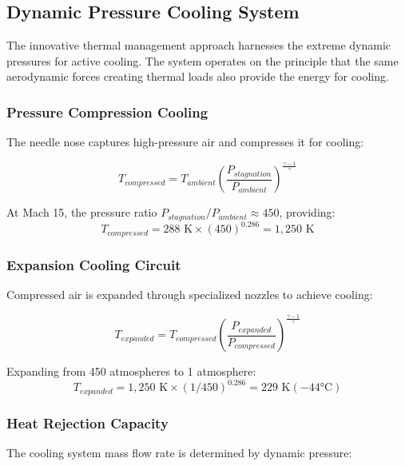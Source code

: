 \documentclass[12pt,a4paper]{article}
\begin{document}
\subsection{Dynamic Pressure Cooling System}

The innovative thermal management approach harnesses the extreme dynamic pressures for active cooling. The system operates on the principle that the same aerodynamic forces creating thermal loads also provide the energy for cooling.

\subsubsection{Pressure Compression Cooling}
The needle nose captures high-pressure air and compresses it for cooling:

\begin{equation}
T_{compressed} = T_{ambient} \left(\frac{P_{stagnation}}{P_{ambient}}\right)^{\frac{\gamma-1}{\gamma}}
\label{eq:compression_temperature}
\end{equation}

At Mach 15, the pressure ratio $P_{stagnation}/P_{ambient} \approx 450$, providing:
\begin{equation}
T_{compressed} = 288 \text{ K} \times (450)^{0.286} = 1,250 \text{ K}
\label{eq:compressed_temp_calc}
\end{equation}

\subsubsection{Expansion Cooling Circuit}
Compressed air is expanded through specialized nozzles to achieve cooling:

\begin{equation}
T_{expanded} = T_{compressed} \left(\frac{P_{expanded}}{P_{compressed}}\right)^{\frac{\gamma-1}{\gamma}}
\label{eq:expansion_temperature}
\end{equation}

Expanding from 450 atmospheres to 1 atmosphere:
\begin{equation}
T_{expanded} = 1,250 \text{ K} \times (1/450)^{0.286} = 229 \text{ K} (-44°\text{C})
\label{eq:expanded_temp_calc}
\end{equation}

\subsubsection{Heat Rejection Capacity}
The cooling system mass flow rate is determined by dynamic pressure:
\end{document}
